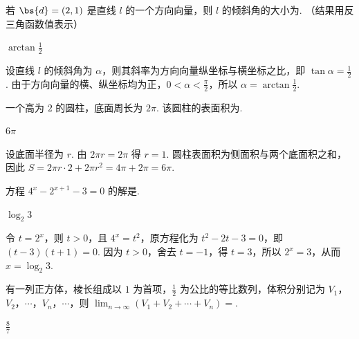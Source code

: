 \begin{problem}
若 \(\bs{d} = (2,1)\) 是直线 \(l\) 的一个方向向量，则 \(l\) 的倾斜角的大小为\fillinblank{}. （结果用反三角函数值表示）
\end{problem}

\begin{answer}
\(\arctan\frac{1}{2}\)
\end{answer}

\begin{solution}
设直线 \(l\) 的倾斜角为 \(\alpha\)，则其斜率为方向向量纵坐标与横坐标之比，即 \(\tan\alpha=\frac{1}{2}\). 由于方向向量的横、纵坐标均为正，\(0<\alpha<\frac{\pi}{2}\)，所以 \(\alpha=\arctan\frac{1}{2}\).
\end{solution}

\begin{problem}
一个高为 \(2\) 的圆柱，底面周长为 \(2\pi\). 该圆柱的表面积为\fillinblank{}.
\end{problem}

\begin{answer}
\(6\pi\)
\end{answer}

\begin{solution}
设底面半径为 \(r\). 由 \(2\pi r=2\pi\) 得 \(r=1\). 圆柱表面积为侧面积与两个底面积之和，因此 \(S=2\pi r\cdot2+2\pi r^2=4\pi+2\pi=6\pi\).
\end{solution}

\begin{problem}
方程 \(4^{x} - 2^{x + 1} - 3 = 0\) 的解是\fillinblank{}.
\end{problem}

\begin{answer}
\(\log_{2}3\)
\end{answer}

\begin{solution}
令 \(t=2^x\)，则 \(t>0\)，且 \(4^x=t^2\)，原方程化为 \(t^2-2t-3=0\)，即 \((t-3)(t+1)=0\). 因为 \(t>0\)，舍去 \(t=-1\)，得 \(t=3\)，所以 \(2^x=3\)，从而 \(x=\log_2 3\).
\end{solution}

\begin{problem}
有一列正方体，棱长组成以 \(1\) 为首项，\(\frac{1}{2}\) 为公比的等比数列，体积分别记为 \(V_{1}\)，\(V_{2}\)，\(\cdots\)，\(V_{n}\)，\(\cdots\)，则 \(\displaystyle\lim_{n \to \infty} (V_{1} + V_{2} + \cdots + V_{n}) =\)\fillinblank{}.
\end{problem}

\begin{answer}
\(\frac{8}{7}\)
\end{answer}

